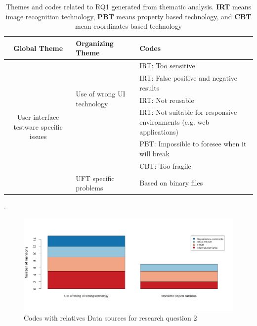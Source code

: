 \begin{table}
\renewcommand{\arraystretch}{1.5}
\centering
\begin{tabular}{ c p{4.3cm} p{4.6cm}}

    \hline
    {\large Global Theme} & {\large Organizing Theme} & {\large Codes}\\
    \hline

    \multirow{7}{*}{\parbox[b]{4.3cm}{
        User interface testware specific issues
    }
    } & \multirow{4}{*}{\parbox[c]{4.3cm}{Use of wrong UI technology}}
        & IRT: Too sensitive \\
        & & IRT: False positive and negative results\\
        & & IRT: Not reusable\\
        & & IRT: Not suitable for responsive environments (e.g. web applications)\\ 
        & & PBT: Impossible to foresee when it will break\\
        & & CBT: Too fragile\\ \cline{2-3}

    & UFT specific problems & Based on binary files\\

    \hline
\end{tabular}
\caption[Themes and codes related to RQ1 generated from thematic analysis.]{Themes and codes related to RQ1 generated from thematic analysis. \textbf{IRT} means image recognition technology, \textbf{PBT} means property based technology, and \textbf{CBT} mean coordinates based technology}.
\label{tab:themes_rq2}
\end{table}

\begin{figure}[!htbp]
    \centering
    \includegraphics[width=\textwidth,keepaspectratio]{figure/results/rq2/sources.png}
    \caption{Codes with relatives Data sources for research question 2}
    \label{fig:rq2_sources}
\end{figure}


